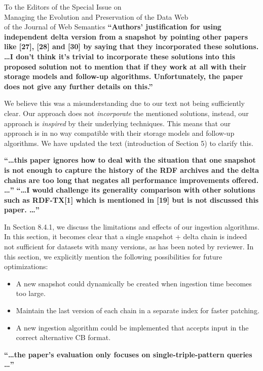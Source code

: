 \documentclass{letter}
\newcounter{section}
\begin{document}
\begin{letter}{To the Editors of the Special Issue on\\Managing the Evolution and Preservation of the Data Web\\of the Journal of Web Semantics}
\textbf{\enquote{Authors' justification for using independent delta version from a snapshot by pointing other papers like [27], [28] and [30] by saying that they incorporated these solutions. \ldots I don't think it's trivial to incorporate these solutions into this proposed solution not to mention that if they work at all with their storage models and follow-up algorithms. Unfortunately, the paper does not give any further details on this.}}

We believe this was a misunderstanding due to our text not being sufficiently clear.
Our approach does not \emph{incorporate} the mentioned solutions,
instead, our approach is \emph{inspired} by their underlying techniques.
This means that our approach is in no way compatible with their storage models and follow-up algorithms.
We have updated the text (introduction of Section 5) to clarify this.

\textbf{\enquote{\ldots this paper ignores how to deal with the situation that one snapshot is not enough to capture the history of the RDF archives and the delta chains are too long that negates all performance improvements offered. \ldots}}
\textbf{\enquote{\ldots I would challenge its generality comparison with other solutions such as RDF-TX[1] which is mentioned in [19] but is not discussed this paper. \ldots}}

In Section 8.4.1, we discuss the limitations and effects of our ingestion algorithms.
In this section, it becomes clear that a single snapshot + delta chain is indeed not sufficient for datasets with many versions,
as has been noted by reviewer.
In this section, we explicitly mention the following possibilities for future optimizations:
\begin{itemize}
    \item A new snapshot could dynamically be created when ingestion time becomes too large.
    \item Maintain the last version of each chain in a separate index for faster patching.
    \item A new ingestion algorithm could be implemented that accepts input in the correct alternative CB format.
\end{itemize}

\textbf{\enquote{\ldots the paper's evaluation only focuses on single-triple-pattern queries \ldots}}


\end{letter}
\end{document}
